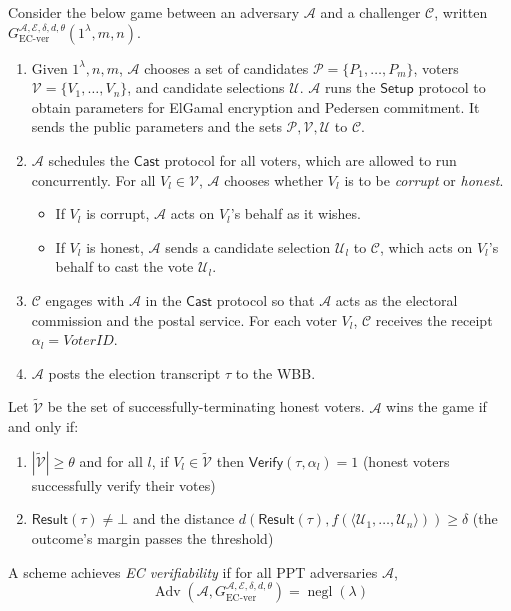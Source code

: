 \documentclass[12pt,a4paper]{article}
\DeclareMathOperator{\negl}{\text{negl}}
\DeclareMathOperator{\Adv}{\text{Adv}}
\theoremstyle{definition}
\newcommand{\VoterID}{\mathit{VoterID}}
\begin{document}
\begin{definition}[EC Verifiability]
    Consider the below game between an adversary $\mathcal{A}$ and a challenger $\mathcal{C}$, written $G_\text{EC-ver}^{\mathcal{A},\mathcal{E},\delta,d,\theta}(1^\lambda, m, n)$.
    \begin{enumerate}
        \item Given $1^\lambda, n, m$, $\mathcal{A}$ chooses a set of candidates $\mathcal{P}=\{P_1,\ldots,P_m\}$, voters $\mathcal{V}=\{V_1,\ldots,V_n\}$, and candidate selections $\mathcal{U}$. $\mathcal{A}$ runs the $\mathsf{Setup}$ protocol to obtain parameters for ElGamal encryption and Pedersen commitment. It sends the public parameters and the sets $\mathcal{P}, \mathcal{V}, \mathcal{U}$ to $\mathcal{C}$.
        
        \item $\mathcal{A}$ schedules the $\mathsf{Cast}$ protocol for all voters, which are allowed to run concurrently. For all $V_l\in\mathcal{V}$, $\mathcal{A}$ chooses whether $V_l$ is to be \textit{corrupt} or \textit{honest}.
        \begin{itemize}
            \item If $V_l$ is corrupt, $\mathcal{A}$ acts on $V_l$'s behalf as it wishes.
            \item If $V_l$ is honest, $\mathcal{A}$ sends a candidate selection $\mathcal{U}_l$ to $\mathcal{C}$, which acts on $V_l$'s behalf to cast the vote $\mathcal{U}_l$.
        \end{itemize}

        \item $\mathcal{C}$ engages with $\mathcal{A}$ in the $\mathsf{Cast}$ protocol so that $\mathcal{A}$ acts as the electoral commission and the postal service. For each voter $V_l$, $\mathcal{C}$ receives the receipt $\alpha_l=\VoterID$.

        \item $\mathcal{A}$ posts the election transcript $\tau$ to the WBB.
    \end{enumerate}
    Let $\tilde{\mathcal{V}}$ be the set of successfully-terminating honest voters. $\mathcal{A}$ wins the game if and only if:
    \begin{enumerate}
        \item $|\tilde{\mathcal{V}}|\geq\theta$ and for all $l$, if $V_l\in\tilde{\mathcal{V}}$ then $\mathsf{Verify}(\tau, \alpha_l)=1$ (honest voters successfully verify their votes)
        \item $\mathsf{Result}(\tau)\neq\bot$ and the distance $d\left(\mathsf{Result}(\tau), f(\langle \mathcal{U}_1, \ldots, \mathcal{U}_n \rangle)\right)\geq \delta$ (the outcome's margin passes the threshold)
    \end{enumerate}
    A scheme achieves \textit{EC verifiability} if for all PPT adversaries $\mathcal{A}$, $$\Adv\left(\mathcal{A}, G_\text{EC-ver}^{\mathcal{A},\mathcal{E},\delta,d,\theta}\right)=\negl(\lambda)$$
\end{definition}
\end{document}
